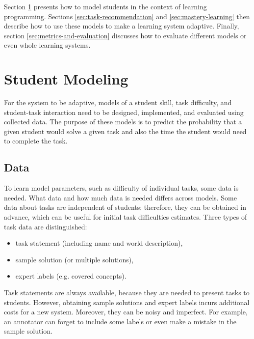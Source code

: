 Section \ref{sec:student-modeling} presents how to model students
  in the context of learning programming.
Sections \ref{sec:task-recommendation} and \ref{sec:mastery-learning}
  then describe how to use these models to make a learning system adaptive.
Finally, section \ref{sec:metrics-and-evaluation} discusses how to evaluate
  different models or even whole learning systems.


\section{Student Modeling}
\label{sec:student-modeling}

For the system to be adaptive, models of
  a student skill, task difficulty, and student-task interaction
  need to be designed, implemented, and evaluated using collected data.
The purpose of these models is to predict the probability that a given student
  would solve a given task
  and also the time the student would need to complete the task.


\subsection{Data}
\label{sec:student-modeling.data}

To learn model parameters, such as difficulty of individual tasks, some data is needed.
What data and how much data is needed differs across models.
Some data about tasks are independent of students;
therefore, they can be obtained in advance,
which can be useful for initial task difficulties estimates.
Three types of task data are distinguished:

\begin{itemize}
  \item task statement (including name and world description),
  \item sample solution (or multiple solutions),
  \item expert labels (e.g. covered concepts).
\end{itemize}

Task statements are always available,
  because they are needed to present tasks to students.
However, obtaining sample solutions and expert labels
  incurs additional costs for a new system.
Moreover, they can be noisy and imperfect.
For example, an annotator can forget to include some labels
  or even make a mistake in the sample solution.


